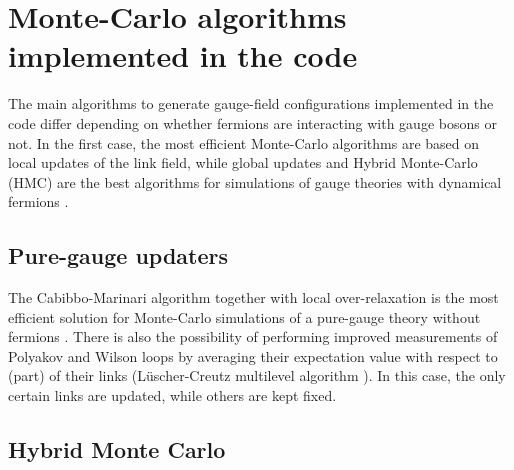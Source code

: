 \documentclass[11pt,a4paper]{article}
\begin{document}
\section{Monte-Carlo algorithms implemented in the code}

The main algorithms to generate gauge-field configurations implemented in the code differ depending on whether fermions are interacting with gauge bosons or not. In the first case, the most efficient Monte-Carlo algorithms are based on local updates of the link field, while global updates and Hybrid Monte-Carlo (HMC) are the best algorithms for simulations of gauge theories with dynamical fermions \cite{GOT87,DUA87}.

\subsection{Pure-gauge updaters}

The Cabibbo-Marinari algorithm together with local over-relaxation is the most efficient solution for Monte-Carlo simulations of a pure-gauge theory without fermions \cite{CAB82,CRE87}. There is also the possibility of performing improved measurements of Polyakov and Wilson loops by averaging their expectation value with respect to (part) of their links (L\"uscher-Creutz multilevel algorithm \cite{LUS01}). In this case, the only certain links are updated, while others are kept fixed.

\subsection{Hybrid Monte Carlo}
\end{document}

